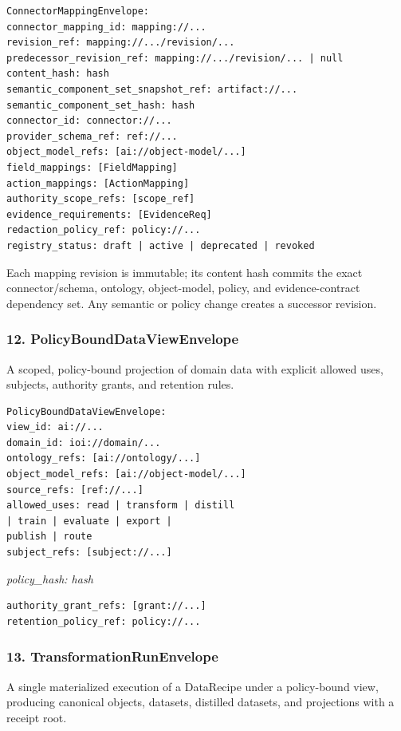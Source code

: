 \documentclass[
  11pt,
]{article}
\begin{document}
\begin{lstlisting}[language={},basicstyle=\ttfamily\scriptsize]
ConnectorMappingEnvelope:
connector_mapping_id: mapping://...
revision_ref: mapping://.../revision/...
predecessor_revision_ref: mapping://.../revision/... | null
content_hash: hash
semantic_component_set_snapshot_ref: artifact://...
semantic_component_set_hash: hash
connector_id: connector://...
provider_schema_ref: ref://...
object_model_refs: [ai://object-model/...]
field_mappings: [FieldMapping]
action_mappings: [ActionMapping]
authority_scope_refs: [scope_ref]
evidence_requirements: [EvidenceReq]
redaction_policy_ref: policy://...
registry_status: draft | active | deprecated | revoked
\end{lstlisting}
Each mapping revision is immutable; its content hash commits the exact
connector/schema, ontology, object-model, policy, and evidence-contract
dependency set. Any semantic or policy change creates a successor revision.
\hypertarget{policybounddataviewenvelope}{%
\subsubsection{12.
PolicyBoundDataViewEnvelope}\label{policybounddataviewenvelope}}

A scoped, policy-bound projection of domain data with explicit allowed
uses, subjects, authority grants, and retention rules.

\begin{lstlisting}[language={},basicstyle=\ttfamily\scriptsize]
PolicyBoundDataViewEnvelope:
view_id: ai://...
domain_id: ioi://domain/...
ontology_refs: [ai://ontology/...]
object_model_refs: [ai://object-model/...]
source_refs: [ref://...]
allowed_uses: read | transform | distill
| train | evaluate | export |
publish | route
subject_refs: [subject://...]
\end{lstlisting}
\emph{policy\_hash: hash}

\begin{lstlisting}[language=rustioi]
authority_grant_refs: [grant://...]
retention_policy_ref: policy://...
\end{lstlisting}
\hypertarget{transformationrunenvelope}{%
\subsubsection{13.
TransformationRunEnvelope}\label{transformationrunenvelope}}

A single materialized execution of a DataRecipe under a policy-bound
view, producing canonical objects, datasets, distilled datasets, and
projections with a receipt root.
\end{document}
